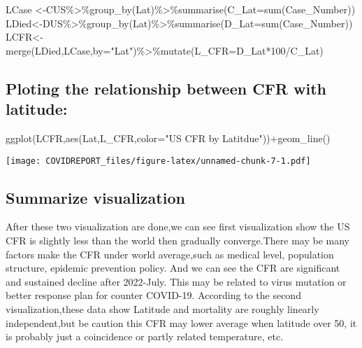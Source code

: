 \documentclass[
]{article}
\newenvironment{Shaded}{\begin{snugshade}}{\end{snugshade}}
\newcommand{\AttributeTok}[1]{\textcolor[rgb]{0.77,0.63,0.00}{#1}}
\newcommand{\DecValTok}[1]{\textcolor[rgb]{0.00,0.00,0.81}{#1}}
\newcommand{\FunctionTok}[1]{\textcolor[rgb]{0.00,0.00,0.00}{#1}}
\newcommand{\NormalTok}[1]{#1}
\newcommand{\OtherTok}[1]{\textcolor[rgb]{0.56,0.35,0.01}{#1}}
\newcommand{\SpecialCharTok}[1]{\textcolor[rgb]{0.00,0.00,0.00}{#1}}
\newcommand{\StringTok}[1]{\textcolor[rgb]{0.31,0.60,0.02}{#1}}
\begin{document}
\begin{Shaded}
\begin{Highlighting}[]
\NormalTok{LCase }\OtherTok{\textless{}{-}}\NormalTok{CUS}\SpecialCharTok{\%\textgreater{}\%}\FunctionTok{group\_by}\NormalTok{(Lat)}\SpecialCharTok{\%\textgreater{}\%}\FunctionTok{summarise}\NormalTok{(}\AttributeTok{C\_Lat=}\FunctionTok{sum}\NormalTok{(Case\_Number))}
\NormalTok{LDied}\OtherTok{\textless{}{-}}\NormalTok{DUS}\SpecialCharTok{\%\textgreater{}\%}\FunctionTok{group\_by}\NormalTok{(Lat)}\SpecialCharTok{\%\textgreater{}\%}\FunctionTok{summarise}\NormalTok{(}\AttributeTok{D\_Lat=}\FunctionTok{sum}\NormalTok{(Case\_Number))}
\NormalTok{LCFR}\OtherTok{\textless{}{-}}\FunctionTok{merge}\NormalTok{(LDied,LCase,}\AttributeTok{by=}\StringTok{"Lat"}\NormalTok{)}\SpecialCharTok{\%\textgreater{}\%}\FunctionTok{mutate}\NormalTok{(}\AttributeTok{L\_CFR=}\NormalTok{D\_Lat}\SpecialCharTok{*}\DecValTok{100}\SpecialCharTok{/}\NormalTok{C\_Lat)}
\end{Highlighting}
\end{Shaded}

\hypertarget{ploting-the-relationship-between-cfr-with-latitude}{%
\subsection{Ploting the relationship between CFR with
latitude:}\label{ploting-the-relationship-between-cfr-with-latitude}}

\begin{Shaded}
\begin{Highlighting}[]
\FunctionTok{ggplot}\NormalTok{(LCFR,}\FunctionTok{aes}\NormalTok{(Lat,L\_CFR,}\AttributeTok{color=}\StringTok{"US CFR by Latitdue"}\NormalTok{))}\SpecialCharTok{+}\FunctionTok{geom\_line}\NormalTok{()}
\end{Highlighting}
\end{Shaded}

\texttt{[image: COVIDREPORT\_files/figure-latex/unnamed-chunk-7-1.pdf]}

\hypertarget{summarize-visualization}{%
\subsection{Summarize visualization}\label{summarize-visualization}}

After these two visualization are done,we can see first visualization
show the US CFR is slightly less than the world then gradually
converge.There may be many factors make the CFR under world average,such
as medical level, population structure, epidemic prevention policy. And
we can see the CFR are significant and sustained decline after
2022-July. This may be related to virus mutation or better response plan
for counter COVID-19. According to the second visualization,these data
show Latitude and mortality are roughly linearly independent,but be
caution this CFR may lower average when latitude over 50, it is probably
just a coincidence or partly related temperature, etc.\\
\end{document}
